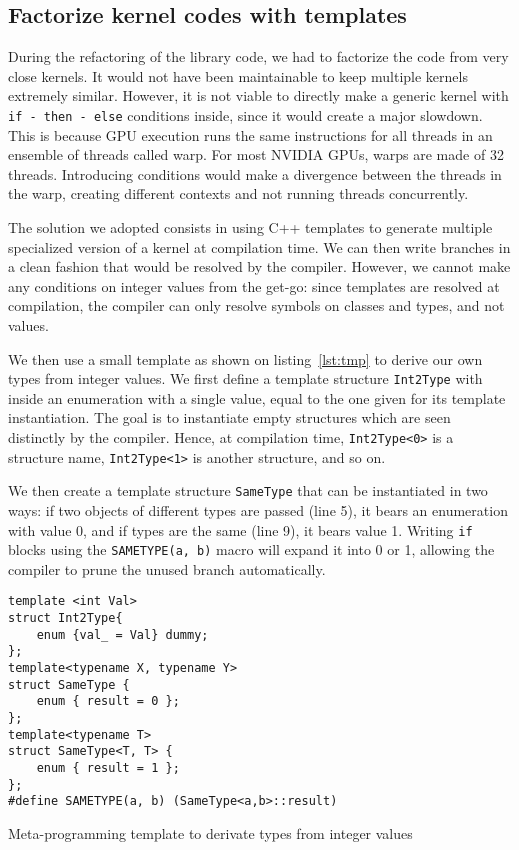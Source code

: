 
\subsection{Factorize kernel codes with templates}

During the refactoring of the library code, we had to factorize the code from very close kernels. It would not have been maintainable to keep multiple kernels extremely similar. However, it is not viable to directly make a generic kernel with \verb|if - then - else| conditions inside, since it would create a major slowdown. This is because GPU execution runs the same instructions for all threads in an ensemble of threads called warp. For most NVIDIA GPUs, warps are made of 32 threads. Introducing conditions would make a divergence between the threads in the warp, creating different contexts and not running threads concurrently.

The solution we adopted consists in using C++ templates to generate multiple specialized version of a kernel at compilation time. We can then write branches in a clean fashion that would be resolved by the compiler. However, we cannot make any conditions on integer values from the get-go: since templates are resolved at compilation, the compiler can only resolve symbols on classes and types, and not values. 

We then use a small template as shown on listing~\ref{lst:tmp} to derive our own types from integer values. We first define a template structure \verb|Int2Type| with inside an enumeration with a single value, equal to the one given for its template instantiation. The goal is to instantiate empty structures which are seen distinctly by the compiler. Hence, at compilation time, \verb|Int2Type<0>| is a structure name, \verb|Int2Type<1>| is another structure, and so on.

We then create a template structure \verb|SameType| that can be instantiated in two ways: if two objects of different types are passed (line 5), it bears an enumeration with value 0, and if types are the same (line 9), it bears value 1. Writing \verb|if| blocks using the \verb|SAMETYPE(a, b)| macro will expand it into 0 or 1, allowing the compiler to prune the unused branch automatically.

\begin{listing}[h!]
	\begin{verbatim}
template <int Val>
struct Int2Type{
	enum {val_ = Val} dummy;
};
template<typename X, typename Y>
struct SameType {
	enum { result = 0 };
};
template<typename T>
struct SameType<T, T> {
	enum { result = 1 };
};
#define SAMETYPE(a, b) (SameType<a,b>::result)
	\end{verbatim}

	
	\caption{Meta-programming template to derivate types from integer values}
	\label{lst:tmp}
\end{listing}
	
